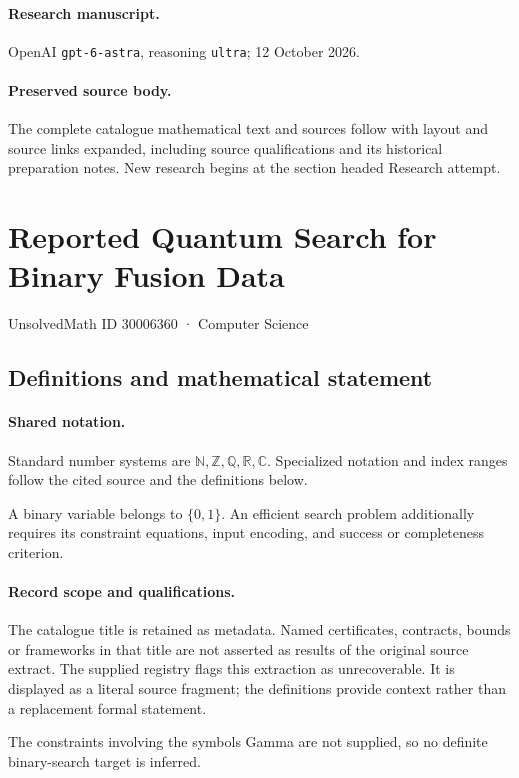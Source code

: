 \documentclass[11pt]{article}
\begin{document}
\paragraph{Research manuscript.} OpenAI \texttt{gpt-6-astra}, reasoning \texttt{ultra}; 12 October 2026.
\paragraph{Preserved source body.} The complete catalogue mathematical text and sources follow with layout and source links expanded, including source qualifications and its historical preparation notes. New research begins at the section headed Research attempt.

\section{Reported Quantum Search for Binary Fusion Data}\label{30006360}
{\small UnsolvedMath ID 30006360 · Computer Science}
\subsection{Definitions and mathematical statement}

\paragraph{Shared notation.}Standard number systems are $\mathbb N,\mathbb Z,\mathbb Q,\mathbb R,\mathbb C$. Specialized notation and index ranges follow the cited source and the definitions below.


A binary variable belongs to $\{0,1\}$. An efficient search problem additionally requires its constraint equations, input encoding, and success or completeness criterion.
\paragraph{Record scope and qualifications.}
The catalogue title is retained as metadata. Named certificates, contracts, bounds or frameworks in that title are not asserted as results of the original source extract.
The supplied registry flags this extraction as unrecoverable. It is displayed as a literal source fragment; the definitions provide context rather than a replacement formal statement.

The constraints involving the symbols Gamma are not supplied, so no definite binary-search target is inferred.
\end{document}
